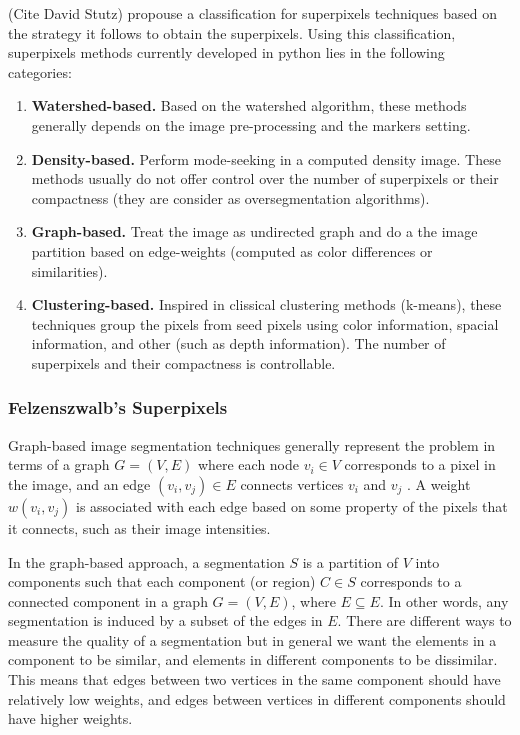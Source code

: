 (Cite David Stutz) propouse a classification for superpixels techniques based on the strategy it follows to obtain the superpixels. Using this classification, superpixels methods currently developed in python lies in the following categories:
\begin{enumerate}
 \item \textbf{Watershed-based.} Based on the watershed algorithm, these methods generally depends on the image pre-processing and the markers setting. 
 \item \textbf{Density-based.} Perform mode-seeking in a computed density image. These methods usually do not offer control over the number of superpixels or their compactness (they are consider as oversegmentation algorithms). 
 \item \textbf{Graph-based.} Treat the image as undirected graph and do a the image partition based on edge-weights  (computed as color differences or similarities).
 \item \textbf{Clustering-based.} Inspired in clissical clustering methods (k-means), these techniques group the pixels from seed pixels using color information, spacial information, and other (such as depth information). The number of superpixels and their compactness is controllable.
\end{enumerate}


\subsubsection{Felzenszwalb's Superpixels}
Graph-based image segmentation techniques generally represent the problem in terms of a graph $G = (V, E)$ where each node $v_i \in V$ corresponds to a pixel in the image, and an edge $(v_i, v_j) \in E$ connects vertices $v_i$ and $v_j$ . A weight $w(v_i, v_j)$ is associated with each edge based on some property of the pixels that it connects, such as their image intensities.

In the graph-based approach, a segmentation $S$ is a partition of $V$ into components such that each component (or region) $C \in S$ corresponds to a connected component in a graph $G = (V, E)$, where $E \subseteq E$. In other words, any segmentation is induced by a subset of the edges in $E$. There are different ways to measure the quality of a segmentation but in general we want the elements in a component to be similar, and elements in different components to be dissimilar. This means that edges between two vertices in the same component should have relatively low weights, and edges between vertices in different components should have higher weights.

